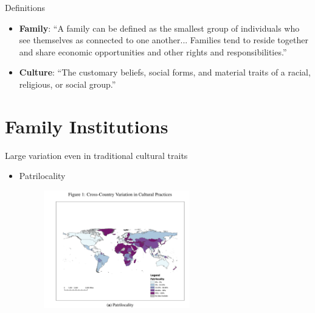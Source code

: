 \documentclass[11pt,notes=hide,aspectratio=169,mathserif]{beamer}
\begin{document}
\begin{frame}{Definitions}
\begin{itemize}
  \item \textbf{Family}: “A family can be defined as the smallest group of individuals who see themselves as connected to one another... Families tend to reside together and share economic opportunities and other rights and responsibilities.”
  \item \textbf{Culture}: “The customary beliefs, social forms, and material traits of a racial, religious, or social group.”
\end{itemize}
\end{frame}

\section{Family Institutions}
\begin{frame}{Large variation even in traditional cultural traits}
\begin{itemize}
  \item Patrilocality
  \begin{figure}
    \centering
    \includegraphics[width=0.6\textwidth]{patri.png}
  \end{figure}
\end{itemize}
\end{frame}
\end{document}
